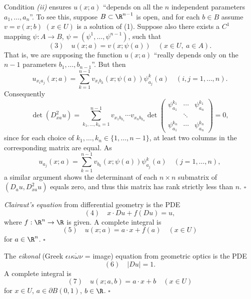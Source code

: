 \begin{remark}
\label{rem:complete-integral-independence}
Condition \textit{(ii)} ensures $u(x;a)$ ``depends on all the $n$ independent parameters $a_1, \ldots, a_n$''. To see this, suppose $B \subset \R^{n-1}$ is open, and for each $b \in B$ assume $v = v(x;b)$ $(x \in U)$ is a solution of (1). Suppose also there exists a $C^1$ mapping $\psi : A \to B$, $\psi = (\psi^1, \ldots, \psi^{n-1})$, such that
$$(3) \quad u(x;a) = v(x;\psi(a)) \quad (x \in U,\ a \in A).$$
That is, we are supposing the function $u(x;a)$ ``really depends only on the $n-1$ parameters $b_1, \ldots, b_{n-1}$''. But then
$$u_{x_i a_j}(x;a) = \sum_{k=1}^{n-1} v_{x_i b_k}(x;\psi(a)) \psi^k_{a_j}(a) \quad (i,j = 1, \ldots, n).$$
Consequently
$$\det(D^2_{xa}u) = \sum_{k_1,\ldots,k_n=1}^{n-1} v_{x_1 b_{k_1}} \cdots v_{x_n b_{k_n}} \det\begin{pmatrix} \psi^{k_1}_{a_1} & \cdots & \psi^{k_1}_{a_n} \\ & \ddots & \\ \psi^{k_n}_{a_1} & \cdots & \psi^{k_n}_{a_n} \end{pmatrix} = 0,$$
since for each choice of $k_1, \ldots, k_n \in \{1, \ldots, n-1\}$, at least two columns in the corresponding matrix are equal. As
$$u_{a_j}(x;a) = \sum_{k=1}^{n-1} v_{b_k}(x;\psi(a)) \psi^k_{a_j}(a) \quad (j = 1, \ldots, n),$$
a similar argument shows the determinant of each $n \times n$ submatrix of $(D_a u, D^2_{xa} u)$ equals zero, and thus this matrix has rank strictly less than $n$. $\square$
\end{remark}

\begin{example}
\label{ex:clairaut-complete-integral}
\textit{Clairaut's equation} from differential geometry is the PDE
$$(4) \quad x \cdot Du + f(Du) = u,$$
where $f : \R^n \to \R$ is given. A complete integral is
$$(5) \quad u(x;a) = a \cdot x + f(a) \quad (x \in U)$$
for $a \in \R^n$. $\square$
\end{example}

\begin{example}
\label{ex:eikonal-complete-integral}
The \textit{eikonal} (Greek $\epsilon\iota\kappa\acute{\omega}\nu$ = image) equation from geometric optics is the PDE
$$(6) \quad |Du| = 1.$$
A complete integral is
$$(7) \quad u(x;a,b) = a \cdot x + b \quad (x \in U)$$
for $x \in U$, $a \in \partial B(0,1)$, $b \in \R$. $\square$
\end{example}

